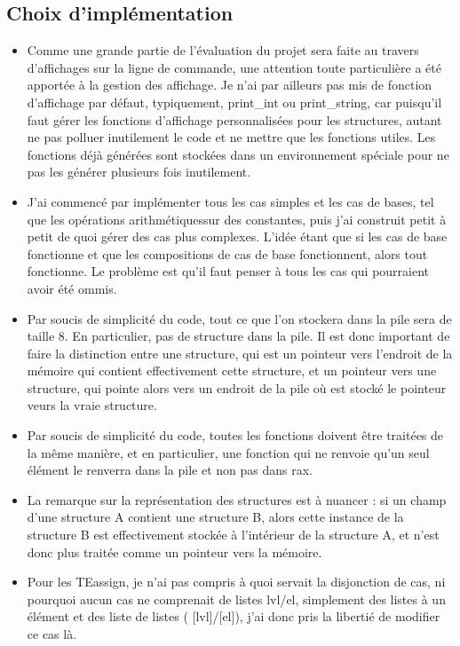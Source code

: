 \documentclass{article}
\begin{document}
\subsection{Choix d'implémentation}
\begin{itemize}
\item Comme une grande partie de l'évaluation du projet sera faite au travers d'affichages sur la ligne de commande, une attention toute particulière a été apportée à la gestion des affichage. Je n'ai par ailleurs pas mis de fonction d'affichage par défaut, typiquement, print\_int ou print\_string, car puisqu'il faut gérer les fonctions d'affichage personnalisées pour les structures, autant ne pas polluer inutilement le code et ne mettre que les fonctions utiles. Les fonctions déjà générées sont stockées dans un environnement spéciale pour ne pas les générer plusieurs fois inutilement.
\item J'ai commencé par implémenter tous les cas simples et les cas de bases, tel que les opérations arithmétiquessur des constantes, puis j'ai construit petit à petit de quoi gérer des cas plus complexes. L'idée étant que si les cas de base fonctionne et que les compositions de cas de base fonctionnent, alors tout fonctionne. Le problème est qu'il faut penser à tous les cas qui pourraient avoir été ommis.
\item Par soucis de simplicité du code, tout ce que l'on stockera dans la pile sera de taille 8. En particulier, pas de structure dans la pile. Il est donc important de faire la distinction entre une structure, qui est un pointeur vers l'endroit de la mémoire qui contient effectivement cette structure, et un pointeur vers une structure, qui pointe alors vers un endroit de la pile où est stocké le pointeur veurs la vraie structure.
\item Par soucis de simplicité du code, toutes les fonctions doivent être traitées de la même manière, et en particulier, une fonction qui ne renvoie qu'un seul élément le renverra dans la pile et non pas dans rax.
\item La remarque sur la représentation des structures est à nuancer : si un champ d'une structure A contient une structure B, alors cette instance de la structure B est effectivement stockée à l'intérieur de la structure A, et n'est donc plus traitée comme un pointeur vers la mémoire.
\item Pour les TEassign, je n'ai pas compris à quoi servait la disjonction de cas, ni pourquoi aucun cas ne comprenait de listes lvl/el, simplement des listes à un élément et des liste de listes ( [lvl]/[el]), j'ai donc pris la libertié de modifier ce cas là.
\end{itemize}
\end{document}
